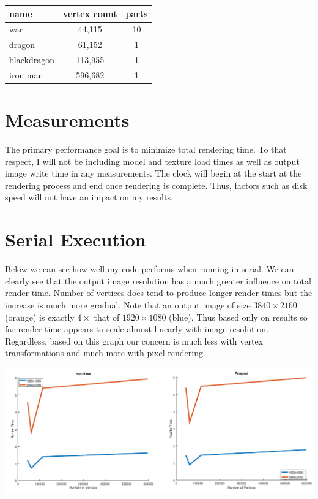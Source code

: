\documentclass[12pt]{article}
\begin{document}
\bigbreak
\begin{center}
	\begin{tabular}{|l|c|c|}
		\hline
		name & vertex count & parts \\ \hline \hline
		war & 44,115 & 10 \\ \hline
		dragon & 61,152 & 1 \\ \hline
		blackdragon & 113,955 & 1 \\ \hline
		iron man & 596,682 & 1 \\ \hline
	\end{tabular}
\end{center}

\section*{Measurements}

The primary performance goal is to minimize total rendering time. To that respect, I will
not be including model and texture load times as well as output image write time in any measurements. 
The clock will begin at the start at the rendering process and end once rendering is complete.
Thus, factors such as disk speed will not have an impact on my results.

\section*{Serial Execution}

Below we can see how well my code performs when running in serial. We can clearly see that the output
image resolution has a much greater influence on total render time. Number of vertices does tend to
produce longer render times but the increase is much more gradual. Note that an output image of 
size $3840\times2160$ (orange) is exactly $4\times$ that of $1920\times1080$ (blue). Thus based only on results so far
render time appears to scale almost linearly with image resolution. Regardless, based on this graph
our concern is much less with vertex transformations and much more with pixel rendering.

\begin{center}
	\includegraphics[width=\textwidth]{serial.png}
\end{center}
\end{document}
